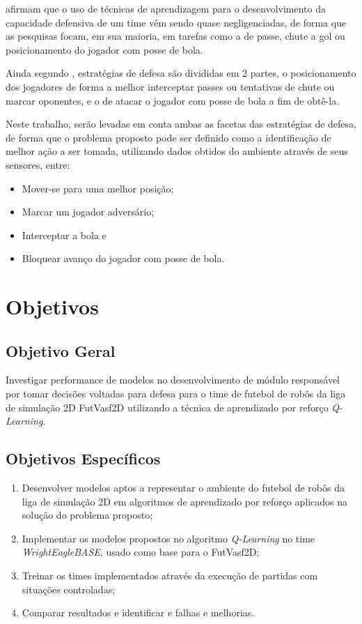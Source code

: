  afirmam que o uso de técnicas de aprendizagem para o desenvolvimento da
capacidade defensiva de um time vêm sendo quase negligenciadas, de forma que as pesquisas focam, em
sua maioria, em tarefas como a de passe, chute a gol ou posicionamento do jogador com posse de bola.

Ainda segundo , estratégias de defesa são divididas em 2 partes, o
posicionamento dos jogadores de forma a melhor interceptar passes ou tentativas de chute ou marcar
oponentes, e o de atacar o jogador com posse de bola a fim de obtê-la.

Neste trabalho, serão levadas em conta ambas as facetas das estratégias de defesa, de forma que o
problema proposto pode ser definido como a identificação de melhor ação a ser tomada, utilizando
dados obtidos do ambiente através de seus sensores, entre:

\begin{itemize}
    \item Mover-se para uma melhor posição;
    \item Marcar um jogador adversário; 
    \item Interceptar a bola e
    \item Bloquear avanço do jogador com posse de bola.
\end{itemize}

\section{Objetivos}

\subsection{Objetivo Geral}

Investigar performance de modelos no desenvolvimento de módulo responsável por tomar decisões
voltadas para defesa para o time de futebol de robôs da liga de simulação 2D FutVasf2D utilizando a
técnica de aprendizado por reforço \textit{Q-Learning}.

\subsection{Objetivos Específicos}

\begin{enumerate}
    \item Desenvolver modelos aptos a representar o ambiente do futebol de robôs da liga de
    simulação 2D em algoritmos de aprendizado por reforço aplicados na solução do problema proposto;
    
    \item Implementar os modelos propostos no algoritmo \textit{Q-Learning} no time
    \textit{WrightEagleBASE}, usado como base para o FutVasf2D;
    
    \item Treinar os times implementados através da execução de partidas com situações controladas;
    
    \item Comparar resultados e identificar e falhas e melhorias.
\end{enumerate}

